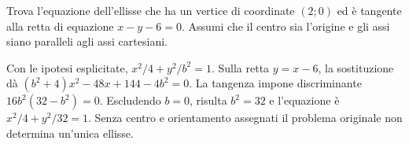 
\begin{esercizio}
Trova l'equazione dell'ellisse che ha un vertice di coordinate $(2;0)$ ed è tangente alla retta di equazione
    $x-y-6=0.$
Assumi che il centro sia l'origine e gli assi siano paralleli agli assi cartesiani.
\end{esercizio}

\begin{soluzione}
Con le ipotesi esplicitate, $x^2/4+y^2/b^2=1$.
Sulla retta $y=x-6$, la sostituzione dà $(b^2+4)x^2-48x+144-4b^2=0$.
La tangenza impone discriminante $16b^2(32-b^2)=0$.
Escludendo $b=0$, risulta $b^2=32$ e l'equazione è $x^2/4+y^2/32=1$.
Senza centro e orientamento assegnati il problema originale non determina un'unica ellisse.
\end{soluzione}
